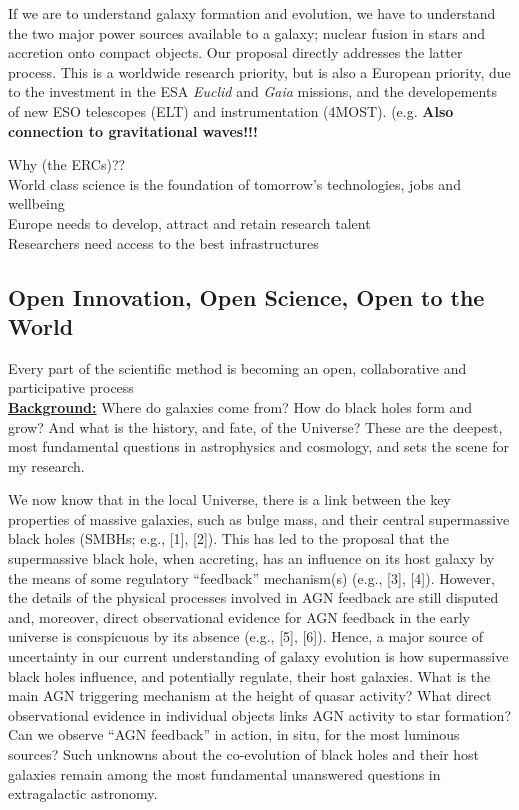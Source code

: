 \documentclass[oneside, a4paper, onecolumn, 11pt]{article}
\begin{document}
\smallskip
\smallskip
\noindent
If we are to understand galaxy formation and evolution, we have to
understand the two major power sources available to a galaxy; nuclear
fusion in stars and accretion onto compact objects. Our proposal
directly addresses the latter process. This is a worldwide research
priority, but is also a European priority, due to the investment in
the ESA {\it Euclid} and {\it Gaia} missions, and the developements of
new ESO telescopes (ELT) and instrumentation (4MOST).  (e.g.
{\bf Also connection to gravitational waves!!!} 



\noindent
Why (the ERCs)??\\
World class science is the foundation of tomorrow’s technologies, jobs and wellbeing\\
Europe needs to develop, attract and retain research talent\\
Researchers need access to the best infrastructures\\


\subsection{Open Innovation, Open Science, Open to the World}
Every part of the scientific method is becoming an open, collaborative and participative process \\





\noindent
{\bf \underline {Background:}}
Where do galaxies come from? How do black holes form and grow? And
what is the history, and fate, of the Universe?  These are the
deepest, most fundamental questions in astrophysics and cosmology, and
sets the scene for my research.

\smallskip 
\smallskip
\noindent
We now know that in the local Universe, there is a link between the
key properties of massive galaxies, such as bulge mass, and their
central supermassive black holes (SMBHs; e.g., [1], [2]). This has led
to the proposal that the supermassive black hole, when accreting, has
an influence on its host galaxy by the means of some regulatory
``feedback'' mechanism(s) (e.g., [3], [4]). However, the details of
the physical processes involved in AGN feedback are still disputed
and, moreover, direct observational evidence for AGN feedback in the
early universe is conspicuous by its absence (e.g., [5], [6]). Hence,
a major source of uncertainty in our current understanding of galaxy
evolution is how supermassive black holes influence, and potentially
regulate, their host galaxies.
What is the main AGN triggering mechanism at the height of quasar
activity? What direct observational evidence in individual objects
links AGN activity to star formation?  Can we observe ``AGN feedback''
in action, in situ, for the most luminous sources?  Such unknowns
about the co-evolution of black holes and their host galaxies remain
among the most fundamental unanswered questions in extragalactic
astronomy.
\end{document}
